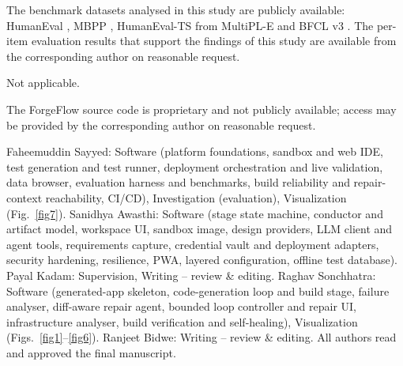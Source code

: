 \documentclass[pdflatex,sn-mathphys-num]{sn-jnl}%
\theoremstyle{thmstyleone}%
\theoremstyle{thmstyletwo}%
\theoremstyle{thmstylethree}%
\begin{document}
The benchmark datasets analysed in this study are publicly available: HumanEval \cite{r25chen}, MBPP \cite{r26austin}, HumanEval-TS from MultiPL-E \cite{r27cassano} and BFCL v3 \cite{r28patil}. The per-item evaluation results that support the findings of this study are available from the corresponding author on reasonable request.

Not applicable.

The ForgeFlow source code is proprietary and not publicly available; access may be provided by the corresponding author on reasonable request.

Faheemuddin Sayyed: Software (platform foundations, sandbox and web IDE, test generation and test runner, deployment orchestration and live validation, data browser, evaluation harness and benchmarks, build reliability and repair-context reachability, CI/CD), Investigation (evaluation), Visualization (Fig.~\ref{fig7}). Sanidhya Awasthi: Software (stage state machine, conductor and artifact model, workspace UI, sandbox image, design providers, LLM client and agent tools, requirements capture, credential vault and deployment adapters, security hardening, resilience, PWA, layered configuration, offline test database). Payal Kadam: Supervision, Writing -- review \& editing. Raghav Sonchhatra: Software (generated-app skeleton, code-generation loop and build stage, failure analyser, diff-aware repair agent, bounded loop controller and repair UI, infrastructure analyser, build verification and self-healing), Visualization (Figs.~\ref{fig1}--\ref{fig6}). Ranjeet Bidwe: Writing -- review \& editing. All authors read and approved the final manuscript.


\end{document}
